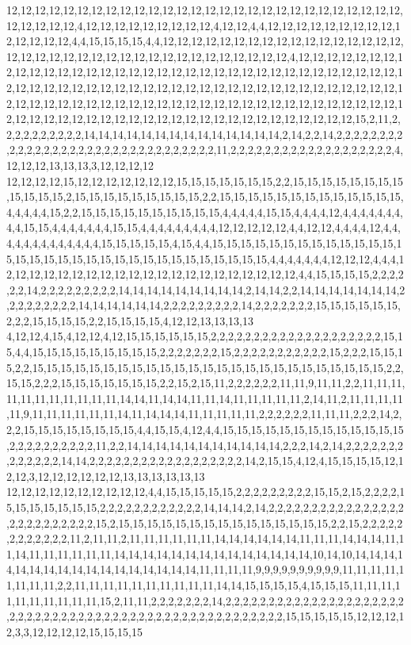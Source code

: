 12,12,12,12,12,12,12,12,12,12,12,12,12,12,12,12,12,12,12,12,12,12,12,12,12,12,12,12,12,12,12,12,12,4,12,12,12,12,12,12,12,12,12,4,12,12,4,4,12,12,12,12,12,12,12,12,12,12,12,12,12,12,4,4,15,15,15,15,4,4,12,12,12,12,12,12,12,12,12,12,12,12,12,12,12,12,12,12,12,12,12,12,12,12,12,12,12,12,12,12,12,12,12,12,12,12,12,4,12,12,12,12,12,12,12,12,12,12,12,12,12,12,12,12,12,12,12,12,12,12,12,12,12,12,12,12,12,12,12,12,12,12,12,12,12,12,12,12,12,12,12,12,12,12,12,12,12,12,12,12,12,12,12,12,12,12,12,12,12,12,12,12,12,12,12,12,12,12,12,12,12,12,12,12,12,12,12,12,12,12,12,12,12,12,12,12,12,12,12,12,12,12,12,12,12,12,12,12,12,12,12,12,12,12,12,12,12,12,12,12,12,12,12,12,15,2,11,2,2,2,2,2,2,2,2,2,2,14,14,14,14,14,14,14,14,14,14,14,14,14,14,2,14,2,2,14,2,2,2,2,2,2,2,2,2,2,2,2,2,2,2,2,2,2,2,2,2,2,2,2,2,2,2,2,2,2,2,2,11,2,2,2,2,2,2,2,2,2,2,2,2,2,2,2,2,2,2,2,4,12,12,12,13,13,13,3,12,12,12,12
12,12,12,12,15,12,12,12,12,12,12,12,15,15,15,15,15,15,15,2,2,15,15,15,15,15,15,15,15,15,15,15,15,2,15,15,15,15,15,15,15,15,15,2,2,15,15,15,15,15,15,15,15,15,15,15,15,15,4,4,4,4,4,15,2,2,15,15,15,15,15,15,15,15,15,15,4,4,4,4,4,15,15,4,4,4,4,12,4,4,4,4,4,4,4,4,4,15,15,4,4,4,4,4,4,4,15,15,4,4,4,4,4,4,4,4,4,12,12,12,12,12,4,4,12,12,4,4,4,4,12,4,4,4,4,4,4,4,4,4,4,4,4,4,15,15,15,15,15,4,15,4,4,15,15,15,15,15,15,15,15,15,15,15,15,15,15,15,15,15,15,15,15,15,15,15,15,15,15,15,15,15,15,15,15,4,4,4,4,4,4,4,12,12,12,4,4,4,12,12,12,12,12,12,12,12,12,12,12,12,12,12,12,12,12,12,12,12,12,4,4,15,15,15,15,2,2,2,2,2,2,14,2,2,2,2,2,2,2,2,2,14,14,14,14,14,14,14,14,14,2,14,14,2,2,14,14,14,14,14,14,14,2,2,2,2,2,2,2,2,2,14,14,14,14,14,14,2,2,2,2,2,2,2,2,2,14,2,2,2,2,2,2,2,15,15,15,15,15,15,2,2,2,15,15,15,15,2,2,15,15,15,15,4,12,12,13,13,13,13
4,12,12,4,15,4,12,12,4,12,15,15,15,15,15,15,2,2,2,2,2,2,2,2,2,2,2,2,2,2,2,2,2,2,2,2,15,15,4,4,15,15,15,15,15,15,15,15,15,2,2,2,2,2,2,2,15,2,2,2,2,2,2,2,2,2,2,2,15,2,2,2,15,15,15,2,2,15,15,15,15,15,15,15,15,15,15,15,15,15,15,15,15,15,15,15,15,15,15,15,15,15,2,2,15,15,2,2,2,15,15,15,15,15,15,15,2,2,15,2,15,11,2,2,2,2,2,2,11,11,9,11,11,2,2,11,11,11,11,11,11,11,11,11,11,11,14,14,11,14,14,11,11,14,11,11,11,11,11,2,14,11,2,11,11,11,11,11,9,11,11,11,11,11,11,14,11,14,14,14,11,11,11,11,11,2,2,2,2,2,2,11,11,11,2,2,2,14,2,2,2,15,15,15,15,15,15,15,15,4,4,15,15,4,12,4,4,15,15,15,15,15,15,15,15,15,15,15,15,15,2,2,2,2,2,2,2,2,2,2,11,2,2,14,14,14,14,14,14,14,14,14,14,14,2,2,2,14,2,14,2,2,2,2,2,2,2,2,2,2,2,2,2,14,14,2,2,2,2,2,2,2,2,2,2,2,2,2,2,2,2,2,2,14,2,15,15,4,12,4,15,15,15,15,12,12,12,3,12,12,12,12,12,12,13,13,13,13,13,13
12,12,12,12,12,12,12,12,12,12,4,4,15,15,15,15,15,2,2,2,2,2,2,2,2,2,15,15,2,15,2,2,2,2,15,15,15,15,15,15,15,2,2,2,2,2,2,2,2,2,2,2,2,14,14,14,2,14,2,2,2,2,2,2,2,2,2,2,2,2,2,2,2,2,2,2,2,2,2,2,2,2,2,2,15,2,15,15,15,15,15,15,15,15,15,15,15,15,15,15,15,2,2,15,2,2,2,2,2,2,2,2,2,2,2,2,11,2,11,11,2,11,11,11,11,11,11,14,14,14,14,14,14,11,11,11,14,14,14,11,11,14,11,11,11,11,11,11,14,14,14,14,14,14,14,14,14,14,14,14,14,14,10,14,10,14,14,14,14,14,14,14,14,14,14,14,14,14,14,14,14,14,11,11,11,11,9,9,9,9,9,9,9,9,9,9,11,11,11,11,11,11,11,11,2,2,11,11,11,11,11,11,11,11,11,11,14,14,15,15,15,15,4,15,15,15,11,11,11,11,11,11,11,11,11,11,15,2,11,11,2,2,2,2,2,2,2,14,2,2,2,2,2,2,2,2,2,2,2,2,2,2,2,2,2,2,2,2,2,2,2,2,2,2,2,2,2,2,2,2,2,2,2,2,2,2,2,2,2,2,2,2,2,2,2,2,2,2,2,2,2,15,15,15,15,15,12,12,12,12,3,3,12,12,12,12,15,15,15,15
